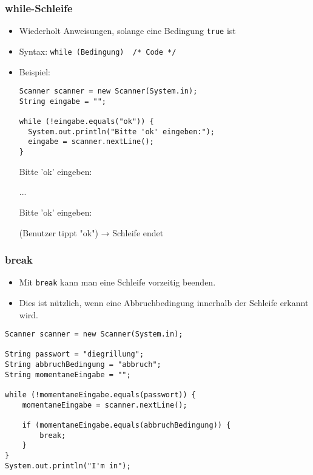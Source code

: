 \documentclass{../../presentation}
\begin{document}
\begin{frame}[fragile]
  \frametitle{while-Schleife}

  \begin{itemize}
    \item<1-> Wiederholt Anweisungen, solange eine Bedingung \texttt{true} ist    
    \item<1-> Syntax: \texttt{while (Bedingung) { /* Code */ }}
    \item<2-> Beispiel:
      \begin{verbatim}
Scanner scanner = new Scanner(System.in);
String eingabe = "";

while (!eingabe.equals("ok")) {
  System.out.println("Bitte 'ok' eingeben:");
  eingabe = scanner.nextLine();
}
      \end{verbatim}
      
      \begin{ausgabe}
Bitte 'ok' eingeben:

...

Bitte 'ok' eingeben:

(Benutzer tippt "ok") → Schleife endet

      \end{ausgabe}
    
      \end{itemize}

\end{frame}


\begin{frame}[fragile]
  \frametitle{break}

  \begin{itemize}
    \item Mit \texttt{break} kann man eine Schleife vorzeitig beenden.
    \item Dies ist nützlich, wenn eine Abbruchbedingung innerhalb der Schleife erkannt wird.
\end{itemize}

\begin{verbatim}
Scanner scanner = new Scanner(System.in);

String passwort = "diegrillung";
String abbruchBedingung = "abbruch";
String momentaneEingabe = "";

while (!momentaneEingabe.equals(passwort)) {
    momentaneEingabe = scanner.nextLine();

    if (momentaneEingabe.equals(abbruchBedingung)) {
        break;
    }
}
System.out.println("I'm in");
\end{verbatim}
\end{frame}
\end{document}
